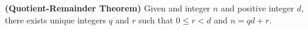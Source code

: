 \guard

\begin{thm}
\label{thm:quotientRemainderTheorem}
  \textbf{(Quotient-Remainder Theorem)}
  Given and integer $n$ and positive integer $d$, there exists unique integers $q$ and $r$ such that $0\leq r < d$ and $n=qd + r$.
\end{thm}
%
